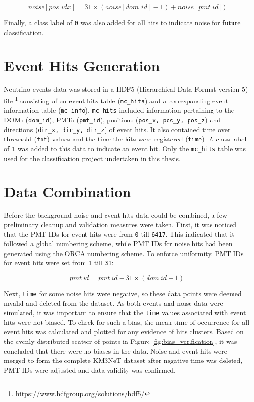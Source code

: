 \begin{equation}
    noise[pos\_idx] = 31 \times (noise[dom\_id] - 1) + noise[pmt\_id])
\end{equation}

Finally, a class label of \texttt{0} was also added for all hits to indicate noise for future classification. 


\section{Event Hits Generation}
Neutrino events data was stored in a HDF5 (Hierarchical Data Format version 5) file \footnote{https://www.hdfgroup.org/solutions/hdf5/} consisting of an event hits table (\texttt{mc\_hits}) and a corresponding event information table (\texttt{mc\_info}). \texttt{mc\_hits} included information pertaining to the DOMs (\texttt{dom\_id}), PMTs (\texttt{pmt\_id}),  positions (\texttt{pos\_x, pos\_y, pos\_z}) and directions (\texttt{dir\_x, dir\_y, dir\_z}) of event hits. It also contained time over threshold (\texttt{tot}) values and the time the hits were registered (\texttt{time}). A class label of \texttt{1} was added to this data to indicate an event hit. Only the \texttt{mc\_hits} table was used for the classification project undertaken in this thesis. 


\section{Data Combination}
Before the background noise and event hits data could be combined, a few preliminary cleanup and validation measures were taken. First, it was noticed that the PMT IDs for event hits were from \texttt{0} till \texttt{6417}. This indicated that it followed a global numbering scheme, while PMT IDs for noise hits had been generated using the ORCA numbering scheme. To enforce uniformity, PMT IDs for event hits were set from \texttt{1} till \texttt{31}: 

\begin{equation}
    pmt\ id = pmt\ id - 31 \times (dom\ id - 1)
\end{equation}

Next, \texttt{time} for some noise hits were negative, so these data points were deemed invalid and deleted from the dataset. As both events and noise data were simulated, it was important to ensure that the \texttt{time} values associated with event hits were not biased. To check for such a bias, the mean time of occurrence for all event hits was calculated and plotted for any evidence of hits clusters. Based on the evenly distributed scatter of points in Figure \ref{fig:bias_verification}, it was concluded that there were no biases in the data. Noise and event hits were merged to form the complete KM3NeT dataset after negative time was deleted, PMT IDs were adjusted and data validity was confirmed.

